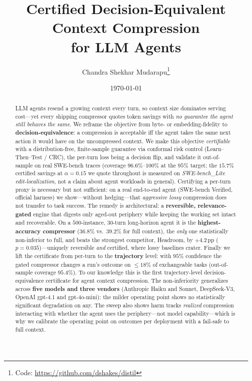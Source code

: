 \documentclass[11pt]{article}
\title{\textbf{Certified Decision-Equivalent Context Compression\\ for LLM Agents}}
\author{%
  Chandra Shekhar Mudarapu\thanks{Code: \url{https://github.com/dshakes/distil}}
}
\date{\today}
\begin{document}
\maketitle

\begin{abstract}
LLM agents resend a growing context every turn, so context size dominates serving cost---yet
every shipping compressor quotes token savings with \emph{no guarantee the agent still behaves
the same}. We reframe the objective from byte- or embedding-fidelity to
\textbf{decision-equivalence}: a compression is acceptable iff the agent takes the same next
action it would have on the uncompressed context. We make this objective \emph{certifiable}
with a distribution-free, finite-sample guarantee via conformal risk control
(Learn--Then--Test / CRC), the per-turn loss being a decision flip, and validate it
out-of-sample on real SWE-bench traces (coverage $96.6\%$--$100\%$ at the $95\%$ target;
the $15.7\%$ certified savings at $\alpha{=}0.15$ we quote throughout is measured on
\emph{SWE-bench\_Lite edit-localization}, not a claim about agent workloads in general).
Certifying a per-turn proxy is necessary but not sufficient: on a real end-to-end agent
(SWE-bench Verified, official harness) we show---without hedging---that \emph{aggressive lossy}
compression does not transfer to task success. The remedy is architectural: a
\textbf{reversible, relevance-gated} engine that digests only aged-out periphery while keeping
the working set intact and recoverable. On a $500$-instance, $30$-turn long-horizon agent it is
the \textbf{highest-accuracy compressor} ($36.8\%$ vs.\ $39.2\%$ for full context), the
\emph{only} one statistically non-inferior to full, and beats the strongest competitor,
Headroom, by $+4.2$\,pp ($p\!=\!0.035$)---uniquely reversible \emph{and} certified, where lossy
baselines crater. Finally we lift the certificate from per-turn to the \textbf{trajectory}
level: with $95\%$ confidence the gated compressor changes a run's outcome on $\le\!18\%$ of
exchangeable tasks (out-of-sample coverage $95.4\%$). To our knowledge this is the first
trajectory-level decision-equivalence certificate for agent context compression. The
non-inferiority generalizes across \textbf{five models and three vendors} (Anthropic Haiku and
Sonnet, DeepSeek-V3, OpenAI gpt-4.1 and gpt-4o-mini): the milder operating point shows no
statistically significant degradation on any. The sweep also shows harm tracks \emph{realized}
compression interacting with whether the agent uses the periphery---not model capability---which
is why we calibrate the operating point on outcomes per deployment with a fail-safe to full
context.
\end{abstract}
\end{document}
